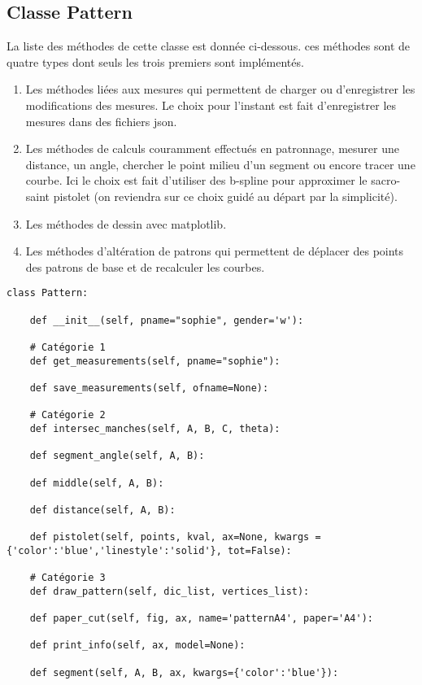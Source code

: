 \documentclass[11pt,a4paper]{article}
\begin{document}
\subsection{Classe Pattern}
La liste des méthodes de cette classe est donnée ci-dessous. ces méthodes sont de quatre types dont seuls les trois premiers sont implémentés.

\begin{enumerate}
\item Les méthodes liées aux mesures qui permettent de charger ou d'enregistrer les modifications des mesures. Le choix pour l'instant est fait d'enregistrer les mesures dans des fichiers json.
\item Les méthodes de calculs couramment effectués en patronnage, mesurer une distance, un angle, chercher le point milieu d'un segment ou encore tracer une courbe. Ici le choix est fait d'utiliser des b-spline pour approximer le sacro-saint pistolet (on reviendra sur ce choix guidé au départ par la simplicité).
\item Les méthodes de dessin avec matplotlib.
\item Les méthodes d'altération de patrons qui permettent de déplacer des points des patrons de base et de recalculer les courbes.
\end{enumerate}



\begin{verbatim}
class Pattern:

	def __init__(self, pname="sophie", gender='w'):
			
	# Catégorie 1		
	def get_measurements(self, pname="sophie"):
		
	def save_measurements(self, ofname=None):

	# Catégorie 2
	def intersec_manches(self, A, B, C, theta):

	def segment_angle(self, A, B):

	def middle(self, A, B):

	def distance(self, A, B):

	def pistolet(self, points, kval, ax=None, kwargs = {'color':'blue','linestyle':'solid'}, tot=False):
		
	# Catégorie 3	
	def draw_pattern(self, dic_list, vertices_list):

	def paper_cut(self, fig, ax, name='patternA4', paper='A4'):	

	def print_info(self, ax, model=None):

	def segment(self, A, B, ax, kwargs={'color':'blue'}):

\end{verbatim}
\end{document}
